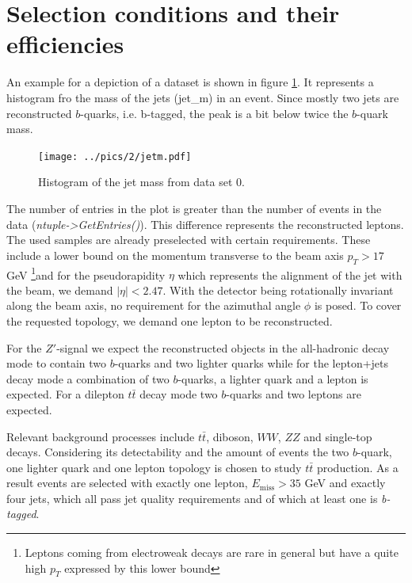 \FloatBarrier
\section{Selection conditions and their efficiencies}
\label{sec:selection}
An example for a depiction of a dataset is shown in figure \ref{pic:examplePlot}. It represents a histogram fro the mass of the jets (jet\_m) in an
event. Since mostly two jets are reconstructed $b$-quarks, i.e. b-tagged, the peak is a bit below twice the $b$-quark mass. 
\begin{figure}[t]
 \texttt{[image: ../pics/2/jetm.pdf]}
 \caption{Histogram of the jet mass from data set 0.}
 \label{pic:examplePlot}
\end{figure}
The number of entries in the plot is greater than the number of events in the data (\emph{ntuple->GetEntries()}). This difference represents the reconstructed leptons.
The used samples are already preselected with certain requirements. These include a lower bound on the momentum transverse to the beam axis $p_T>17$ GeV 
\footnote[1]{Leptons coming from electroweak
decays are rare in general but have a quite high $p_T$ expressed by this lower bound}and
for the pseudorapidity $\eta$ which represents the alignment of the jet with the beam, we demand $|\eta| < 2.47$. With the detector being rotationally
invariant along the beam axis, no requirement for the azimuthal angle $\phi$ is posed. To cover the requested topology, we demand one lepton to be reconstructed. 

For the $Z'$-signal we expect the reconstructed objects in the all-hadronic decay mode to contain two $b$-quarks and two lighter quarks while for the lepton+jets decay mode a combination of two $b$-quarks, a lighter quark and a lepton is expected. For a dilepton $t\bar{t}$ decay mode two $b$-quarks and two leptons are expected.

Relevant background processes include $t\bar{t}$, diboson, $WW$, $ZZ$ and single-top decays. Considering its detectability and the amount of events the two $b$-quark, one lighter quark and one lepton topology is chosen to study $t\bar{t}$ production. As a result events are selected with exactly one lepton, $E_\text{miss} > 35$ GeV and exactly four jets, which all pass jet quality requirements and of which at least one is \emph{b-tagged}.

